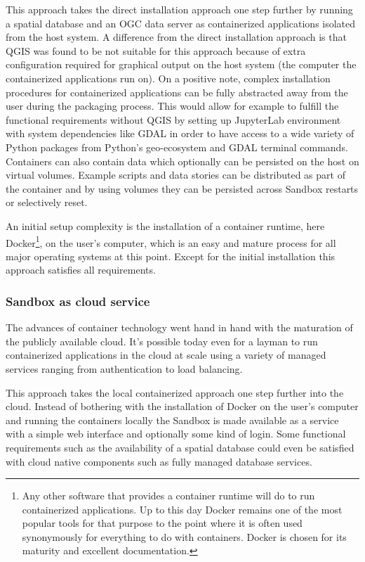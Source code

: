 \documentclass[11pt, a4paper, oneside, parskip=full-]{scrartcl}
\begin{document}
This approach takes the direct installation approach one step further by running
a spatial database and an OGC data server as containerized applications isolated
from the host system. A difference from the direct installation approach is that
QGIS was found to be not suitable for this approach because of extra
configuration required for graphical output on the host system (the computer the
containerized applications run on). On a positive note, complex installation
procedures for containerized applications can be fully abstracted away from the
user during the packaging process. This would allow for example to fulfill the
functional requirements without QGIS by setting up JupyterLab environment with
system dependencies like GDAL in order to have access to a wide variety of
Python packages from Python's geo-ecosystem and GDAL terminal commands.
Containers can also contain data which optionally can be persisted on the host
on virtual volumes. Example scripts and data stories can be distributed as part
of the container and by using volumes they can be persisted across Sandbox
restarts or selectively reset.

An initial setup complexity is the installation of a container runtime, here
Docker\footnote{Any other software that provides a container runtime will do to
run containerized applications. Up to this day Docker remains one of the most
popular tools for that purpose to the point where it is often used synonymously
for everything to do with containers. Docker is chosen for its maturity and
excellent documentation.}, on the user's computer, which is an easy and mature
process for all major operating systems at this point. Except for the initial
installation this approach satisfies all requirements.

\subsubsection*{Sandbox as cloud service}
The advances of container technology went hand in hand with the maturation of
the publicly available cloud. It's possible today even for a layman to run
containerized applications in the cloud at scale using a variety of managed
services ranging from authentication to load balancing.

This approach takes the local containerized approach one step further into the
cloud. Instead of bothering with the installation of Docker on the user's
computer and running the containers locally the Sandbox is made available as a
service with a simple web interface and optionally some kind of login. Some
functional requirements such as the availability of a spatial database could
even be satisfied with cloud native components such as fully managed database
services.
\end{document}

